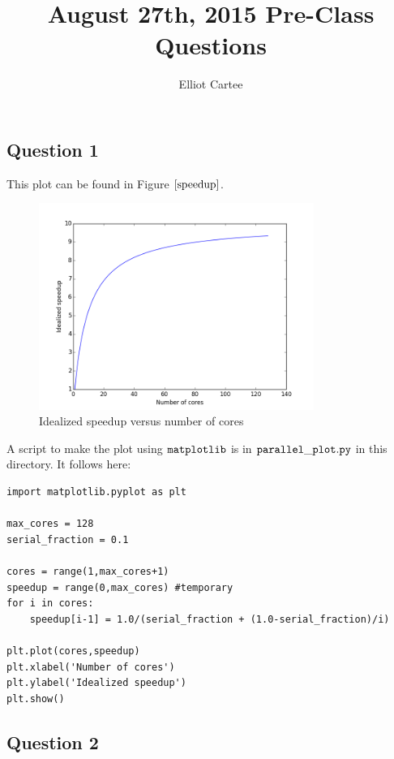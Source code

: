 \documentclass[11pt]{article}
\title{August 27th, 2015 Pre-Class Questions}
\author{Elliot Cartee}
\begin{document}
\maketitle
\subsection*{Question 1}

This plot can be found in Figure $\ref{speedup}$.

\begin{figure}[h]
	\centering
	\caption{\label{speedup}Idealized speedup versus number of cores}
	\includegraphics[width=0.8\textwidth]{figure_1.png}
\end{figure}

A script to make the plot using $\begin{tt}matplotlib\end{tt}$ is in $\begin{tt}parallel\_plot.py\end{tt}$ in this directory. It follows here:

\newpage
\begin{verbatim}
import matplotlib.pyplot as plt

max_cores = 128
serial_fraction = 0.1

cores = range(1,max_cores+1)
speedup = range(0,max_cores) #temporary
for i in cores:
	speedup[i-1] = 1.0/(serial_fraction + (1.0-serial_fraction)/i)

plt.plot(cores,speedup)
plt.xlabel('Number of cores')
plt.ylabel('Idealized speedup')
plt.show() 
\end{verbatim}




\subsection*{Question 2}
\end{document}
